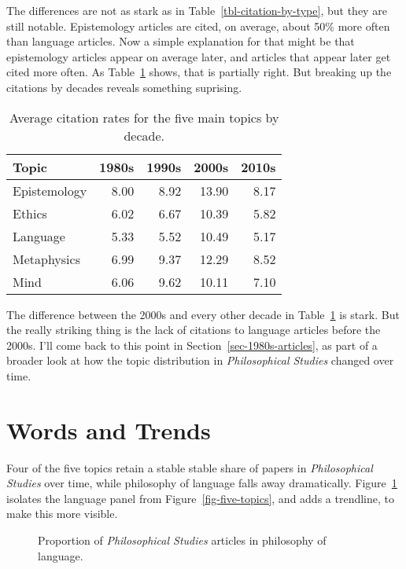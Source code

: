 \documentclass[
  10pt,
  letterpaper,
  DIV=11,
  numbers=noendperiod,
  twoside]{scrartcl}
\begin{document}
The differences are not as stark as in Table~\ref{tbl-citation-by-type},
but they are still notable. Epistemology articles are cited, on average,
about 50\% more often than language articles. Now a simple explanation
for that might be that epistemology articles appear on average later,
and articles that appear later get cited more often. As
Table~\ref{tbl-topics-cites-decades} shows, that is partially right. But
breaking up the citations by decades reveals something suprising.

\begin{longtable}[]{@{}lrrrr@{}}

\caption{\label{tbl-topics-cites-decades}Average citation rates for the
five main topics by decade.}

\tabularnewline

\toprule\noalign{}
Topic & 1980s & 1990s & 2000s & 2010s \\
\midrule\noalign{}
\endhead
\bottomrule\noalign{}
\endlastfoot
Epistemology & 8.00 & 8.92 & 13.90 & 8.17 \\
Ethics & 6.02 & 6.67 & 10.39 & 5.82 \\
Language & 5.33 & 5.52 & 10.49 & 5.17 \\
Metaphysics & 6.99 & 9.37 & 12.29 & 8.52 \\
Mind & 6.06 & 9.62 & 10.11 & 7.10 \\

\end{longtable}

The difference between the 2000s and every other decade in
Table~\ref{tbl-topics-cites-decades} is stark. But the really striking
thing is the lack of citations to language articles before the 2000s.
I'll come back to this point in Section~\ref{sec-1980s-articles}, as
part of a broader look at how the topic distribution in
\emph{Philosophical Studies} changed over time.

\section{Words and Trends}\label{sec-words-and-trends}

Four of the five topics retain a stable stable share of papers in
\emph{Philosophical Studies} over time, while philosophy of language
falls away dramatically. Figure~\ref{fig-language} isolates the language
panel from Figure~\ref{fig-five-topics}, and adds a trendline, to make
this more visible.

\begin{figure}


\caption{\label{fig-language}Proportion of \emph{Philosophical Studies}
articles in philosophy of language.}

\end{figure}%
\end{document}
